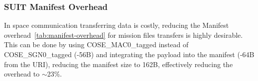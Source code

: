 \subsubsection{SUIT Manifest Overhead}

In space communication transferring data is costly, reducing the Manifest
overhead~\ref{tab:manifest-overhead} for mission files transfers is highly
desirable. This can be done by using COSE\_MAC0\_tagged instead of
COSE\_SGN0\_tagged (-56B) and integrating the payload into the
manifest (-64B from the URI), reducing the manifest size to 162B,
effectively reducing the overhead to $\sim$23\%.

